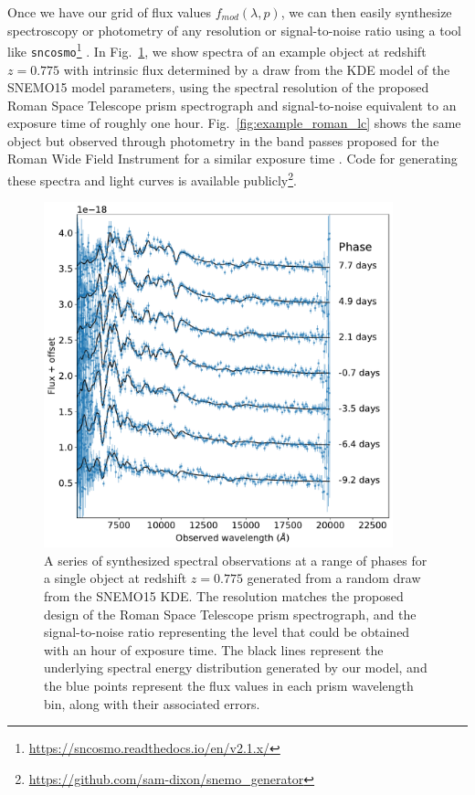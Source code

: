 Once we have our grid of flux values $f_{mod}(\lambda, p)$, we can then easily synthesize spectroscopy or photometry of any resolution or signal-to-noise ratio using a tool like \verb|sncosmo|\footnote{\url{https://sncosmo.readthedocs.io/en/v2.1.x/}} . In Fig.~\ref{fig:example_prism_spec}, we show spectra of an example object at redshift $z=0.775$ with intrinsic flux determined by a draw from the KDE model of the SNEMO15 model parameters, using the spectral resolution of the proposed Roman Space Telescope prism spectrograph and signal-to-noise equivalent to an exposure time of roughly one hour. Fig.~\ref{fig:example_roman_lc} shows the same object but observed through photometry in the band passes proposed for the Roman Wide Field Instrument for a similar exposure time \citep{rubin_evaluating_2020, roman_space_telescope_reference_information_roman_2019}. Code for generating these spectra and light curves is available publicly\footnote{\url{https://github.com/sam-dixon/snemo_generator}}.

\begin{figure}
    \centering
    \includegraphics[width=0.9\textwidth]{figures/snemo_kde/example_roman_spec.pdf}
    \caption{A series of synthesized spectral observations at a range of phases for a single object at redshift $z=0.775$ generated from a random draw from the SNEMO15 KDE. The resolution matches the proposed design of the Roman Space Telescope prism spectrograph, and the signal-to-noise ratio representing the level that could be obtained with an hour of exposure time. The black lines represent the underlying spectral energy distribution generated by our model, and the blue points represent the flux values in each prism wavelength bin, along with their associated errors.}
    \label{fig:example_prism_spec}
\end{figure}

